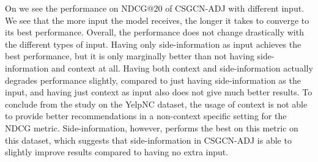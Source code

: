 On  we see the performance on NDCG@20 of CSGCN-ADJ with different input.
We see that the more input the model receives, the longer it takes to converge to its best performance.
Overall, the performance does not change drastically with the different types of input.
Having only side-information as input achieves the best performance, but it is only marginally better than not having side-information and context at all.
Having both context and side-information actually degrades performance slightly, compared to just having side-information as the input, and having just context as input also does not give much better results.
To conclude from the study on the YelpNC dataset, the usage of context is not able to provide better recommendations in a non-context specific setting for the NDCG metric.
Side-information, however, performs the best on this metric on this dataset, which suggests that side-information in CSGCN-ADJ is able to slightly improve results compared to having no extra input.

